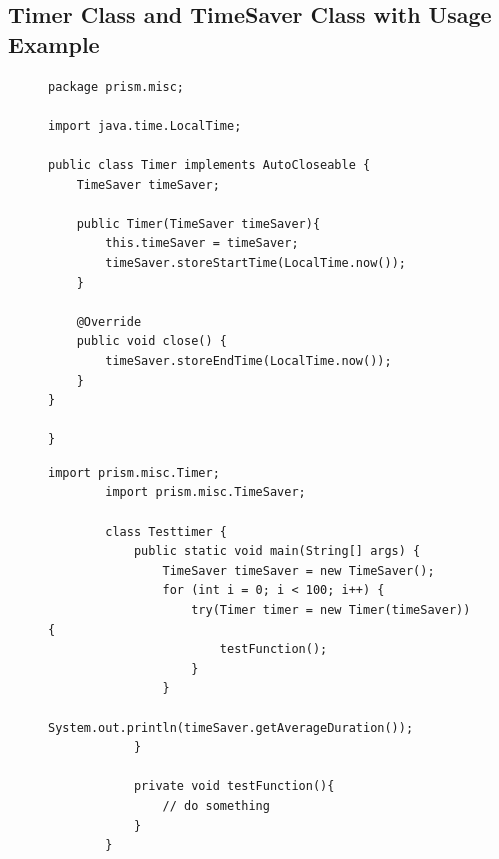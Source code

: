 \documentclass[preview]{standalone}
\begin{document}
\subsection[Classes Time Measuring and Usage Example]{Timer Class and TimeSaver Class with Usage Example}\label{apx:timerandexmp}
\begin{figure}[!htb]
\begin{lstlisting}[style=javaStyle, caption={Timer.java}]
package prism.misc;

import java.time.LocalTime;

public class Timer implements AutoCloseable {
	TimeSaver timeSaver;
	
	public Timer(TimeSaver timeSaver){
		this.timeSaver = timeSaver;
		timeSaver.storeStartTime(LocalTime.now());
	}
	
	@Override
	public void close() {
		timeSaver.storeEndTime(LocalTime.now());
	}
}

}
\end{lstlisting}
\end{figure}

\begin{figure}[!htb]
	\begin{lstlisting}[style=javaStyle, caption={Example for measuring time with Timer}]
		import prism.misc.Timer;
		import prism.misc.TimeSaver;
		
		class Testtimer {
			public static void main(String[] args) {				
				TimeSaver timeSaver = new TimeSaver();				
				for (int i = 0; i < 100; i++) {
					try(Timer timer = new Timer(timeSaver)) {
						testFunction();
					}
				}			
				System.out.println(timeSaver.getAverageDuration());				
			}
			
			private void testFunction(){
				// do something
			}
		}
	\end{lstlisting}
\end{figure}
\end{document}
